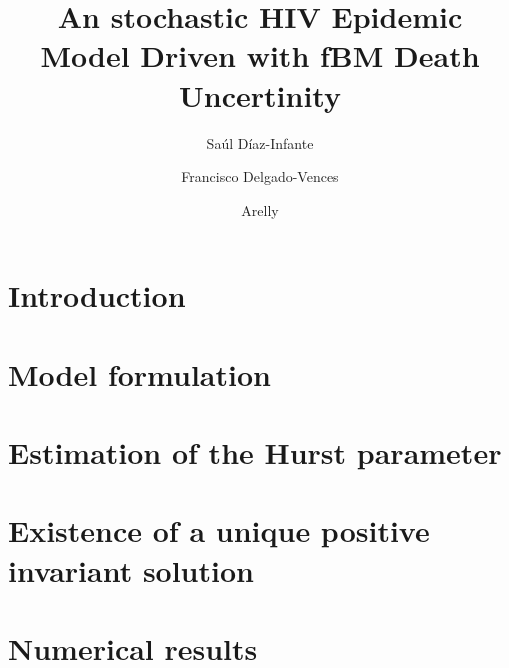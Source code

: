 \documentclass[3p,sort&compress,times]{elsarticle}
\DeclareRobustCommand{\1}[1]{\ensuremath \mathbbm{1}_{\{#1\}}}
\begin{document}
  \begin{frontmatter}
     \author[add:conacyt_unison]{%
      Sa\'ul D\'iaz-Infante
    }%
    \author[add:conacyt_unam]{%
      Francisco Delgado-Vences
    }%
    \author[add:institution]{%
      Arelly 
    }%
    \address[add:conacyt_unison]{
      CONACYT-Universidad de Sonora, Departamento de Matem\'aticas, Boulevard
      Luis Encinas y Rosales S/N, Col. Centro, Hermosillo, Sonora, 
      M\'exico.
    }
    \address[add:conacyt_unam]{
      CONACYT-UNAM, Instituto de Matem\'aticas, Sede
      Oaxaca, M\'exico.
    }
  \title{An stochastic HIV Epidemic Model Driven with fBM Death Uncertinity}
  \author{}
  \address{}
\begin{abstract}
\end{abstract}%

\begin{keyword}

\end{keyword}

\end{frontmatter}


\section{Introduction} \label{sec:intro}
\section{Model formulation} \label{sec:model_formulation}
\section{Estimation of the Hurst parameter}\label{sec:hurst_parameter}
\section{Existence of a unique positive invariant solution} 
\label{sec:existence}
\section{Numerical results} \label{sec:numerical_results}
\end{document}
